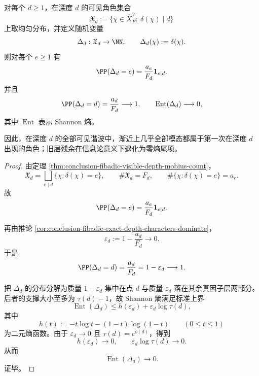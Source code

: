 \begin{theorem}[首次可见深度分布的零熵塌缩]\label{thm:conclusion-fibadic-first-appearance-entropy-collapse}
对每个 \(d\ge 1\)，在深度 \(d\) 的可见角色集合
\[
\mathfrak X_d:=\{\chi\in \widehat X_F^\vee:\ \delta(\chi)\mid d\}
\]
上取均匀分布，并定义随机变量
\[
\Delta_d:\mathfrak X_d\to \NN,
\qquad
\Delta_d(\chi):=\delta(\chi).
\]
则对每个 \(e\ge 1\) 有
\[
\PP(\Delta_d=e)=\frac{a_e}{F_d}\mathbf 1_{e\mid d}.
\]
并且
\[
\PP(\Delta_d=d)=\frac{a_d}{F_d}\longrightarrow 1,
\qquad
\operatorname{Ent}(\Delta_d)\longrightarrow 0,
\]
其中 \(\operatorname{Ent}\) 表示 Shannon 熵。

因此，在深度 \(d\) 的全部可见谐波中，渐近上几乎全部模态都属于第一次在深度 \(d\) 出现的角色；旧层残余在信息论意义下退化为零熵尾项。
\end{theorem}
\begin{proof}
由定理 \ref{thm:conclusion-fibadic-visible-depth-mobius-count}，
\[
\mathfrak X_d
=
\bigsqcup_{e\mid d}\{\chi:\delta(\chi)=e\},
\qquad
\#\mathfrak X_d=F_d,
\qquad
\#\{\chi:\delta(\chi)=e\}=a_e.
\]
故
\[
\PP(\Delta_d=e)=\frac{a_e}{F_d}\mathbf 1_{e\mid d}.
\]

再由推论 \ref{cor:conclusion-fibadic-exact-depth-characters-dominate}，
\[
\varepsilon_d:=1-\frac{a_d}{F_d}\longrightarrow 0.
\]
于是
\[
\PP(\Delta_d=d)=\frac{a_d}{F_d}=1-\varepsilon_d\longrightarrow 1.
\]

把 \(\Delta_d\) 的分布分解为质量 \(1-\varepsilon_d\) 集中在点 \(d\) 与质量 \(\varepsilon_d\) 落在其余真因子层两部分。后者的支撑大小至多为 \(\tau(d)-1\)，故 Shannon 熵满足标准上界
\[
\operatorname{Ent}(\Delta_d)
\le
h(\varepsilon_d)+\varepsilon_d\log \tau(d),
\]
其中
\[
h(t):=-t\log t-(1-t)\log(1-t)
\qquad
(0\le t\le 1)
\]
为二元熵函数。由于 \(\varepsilon_d\to 0\) 且 \(\tau(d)=e^{o(d)}\)，得到
\[
h(\varepsilon_d)\to 0,
\qquad
\varepsilon_d\log \tau(d)\to 0.
\]
从而
\[
\operatorname{Ent}(\Delta_d)\to 0.
\]
证毕。
\end{proof}

